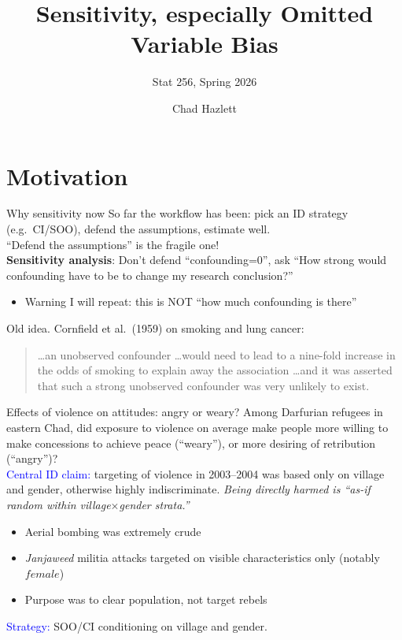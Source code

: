 \documentclass[xcolor=dvipsnames]{beamer}
\title[]{Sensitivity, especially Omitted Variable Bias}
\subtitle[ ]{Stat 256, Spring 2026}
\author[Hazlett]{Chad Hazlett }
\institute[UCLA]{UCLA\\[1ex]
  \texttt{chazlett@ucla.edu}
}
\date{}
\begin{document}
\begin{frame}
  \titlepage
\end{frame}

\subject{Talks}


\section{Motivation}

\begin{frame}{Why sensitivity now}
\small
{} So far the workflow has been: pick an ID strategy (e.g.\ CI/SOO), defend the assumptions, estimate well.\\
\bigskip
{}  ``Defend the assumptions'' is the fragile one!\\
\bigskip
{} \textbf{Sensitivity analysis}: Don't defend ``confounding=0'', ask ``How strong would confounding have to be to change my research conclusion?'' \\
\bigskip
\begin{itemize}
\item<4-> Warning I will repeat: this is NOT ``how much confounding is there''
\end{itemize}
\bigskip
{} Old idea. Cornfield et al.\ (1959) on smoking and lung cancer:\\
\footnotesize
\begin{quote}
\dots an unobserved confounder \dots would need to lead to a nine-fold increase in the odds of smoking to explain away the association \dots and it was asserted that such a strong unobserved confounder was very unlikely to exist.
\end{quote}
\end{frame}


\begin{frame}{Effects of violence on attitudes: angry or weary?}
\small
{} Among Darfurian refugees in eastern Chad, did exposure to violence on average make people more willing to make concessions to achieve peace (``weary''), or more desiring of retribution (``angry'')?\\
\medskip
{} \textcolor{Blue}{Central ID claim:} targeting of violence in 2003--2004 was based only on village and gender, otherwise highly indiscriminate. \textit{Being directly harmed is ``as-if random within village$\times$gender strata.''}\\
\medskip
\begin{itemize}
\item<3-> Aerial bombing was extremely crude
\item<4-> \textit{Janjaweed} militia attacks targeted on visible characteristics only (notably $\mathit{female}$)
\item<5-> Purpose was to clear population, not target rebels
\end{itemize}
\medskip
{} \textcolor{Blue}{Strategy:} SOO/CI conditioning on village and gender.
\end{frame}
\end{document}
